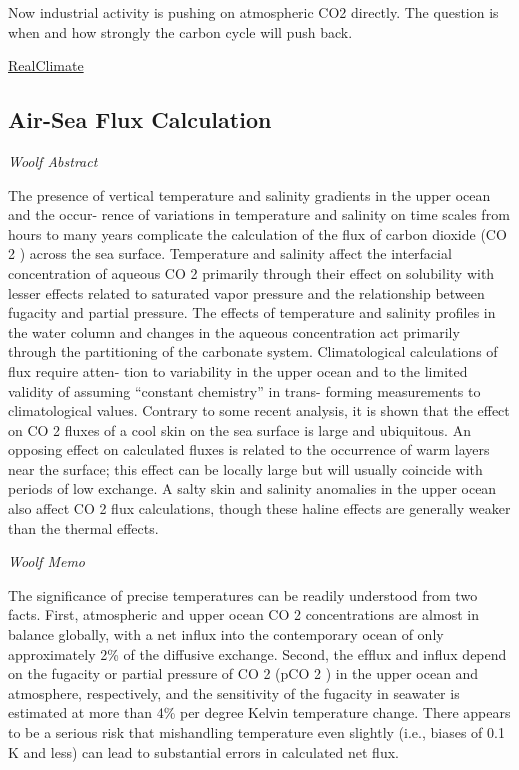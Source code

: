 \documentclass[
]{book}
\begin{document}
Now industrial activity is pushing on atmospheric CO2 directly. The question is when and how strongly the carbon cycle will push back.

\href{https://www.realclimate.org/index.php/archives/2007/11/is-the-ocean-carbon-sink-sinking/}{RealClimate}

\hypertarget{air-sea-flux-calculation}{%
\subsection{Air-Sea Flux Calculation}\label{air-sea-flux-calculation}}

\emph{Woolf Abstract}

The presence of vertical temperature and salinity gradients in the upper ocean and the occur-
rence of variations in temperature and salinity on time scales from hours to many years complicate the
calculation of the ﬂux of carbon dioxide (CO 2 ) across the sea surface. Temperature and salinity affect the
interfacial concentration of aqueous CO 2 primarily through their effect on solubility with lesser effects
related to saturated vapor pressure and the relationship between fugacity and partial pressure. The effects
of temperature and salinity proﬁles in the water column and changes in the aqueous concentration act
primarily through the partitioning of the carbonate system. Climatological calculations of ﬂux require atten-
tion to variability in the upper ocean and to the limited validity of assuming ``constant chemistry'' in trans-
forming measurements to climatological values. Contrary to some recent analysis, it is shown that the effect
on CO 2 ﬂuxes of a cool skin on the sea surface is large and ubiquitous. An opposing effect on calculated
ﬂuxes is related to the occurrence of warm layers near the surface; this effect can be locally large but will
usually coincide with periods of low exchange. A salty skin and salinity anomalies in the upper ocean also
affect CO 2 ﬂux calculations, though these haline effects are generally weaker than the thermal effects.

\emph{Woolf Memo}

The signiﬁcance of precise temperatures can be
readily understood from two facts. First, atmospheric and upper ocean CO 2 concentrations are almost in
balance globally, with a net inﬂux into the contemporary ocean of only approximately 2\% of the diffusive
exchange. Second, the efﬂux and inﬂux depend on the fugacity or partial pressure of CO 2 (pCO 2 ) in the
upper ocean and atmosphere, respectively, and the sensitivity of the fugacity in seawater is estimated at
more than 4\% per degree Kelvin temperature change.
There appears to be a
serious risk that mishandling temperature even slightly (i.e., biases of 0.1 K and less) can lead to substantial
errors in calculated net ﬂux.
\end{document}
